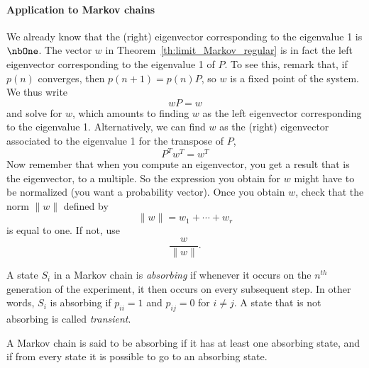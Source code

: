 \paragraph{Application to Markov chains}
We already know that the (right) eigenvector corresponding to the eigenvalue 1 is $\nbOne$.
The vector $w$ in Theorem~\ref{th:limit_Markov_regular} is in fact the left eigenvector corresponding to the eigenvalue 1 of $P$.
To see this, remark that, if $p(n)$ converges, then $p(n+1)=p(n)P$, so $w$ is a fixed point of the system. We thus write
\[
wP=w
\]
and solve for $w$, which amounts to finding $w$ as the left eigenvector corresponding to the eigenvalue 1.
\vskip0.5cm
Alternatively, we can find $w$ as the (right) eigenvector associated to the eigenvalue 1 for the transpose of $P$,
\[
P^Tw^T=w^T
\]
Now remember that when you compute an eigenvector, you get a result that is the eigenvector, to a multiple.
So the expression you obtain for $w$ might have to be normalized (you want a probability vector). Once you obtain $w$, check that the norm $\|w\|$ defined by
\[
\|w\|=w_1+\cdots+w_r
\]
is equal to one. If not, use
\[
\frac{w}{\|w\|}.
\]







\begin{definition}
A state $S_i$ in a Markov chain is \emph{absorbing} if whenever it occurs on the $n^{th}$ generation of the experiment, it then occurs on every subsequent step. In other words, $S_i$ is absorbing if $p_{ii}=1$ and $p_{ij}=0$ for $i\neq j$. A state that is not absorbing is called \emph{transient}.
\end{definition}

\begin{definition}
A Markov chain is said to be absorbing if it has at least one absorbing state, and if from every state it is possible to go to an absorbing state.
\end{definition}



